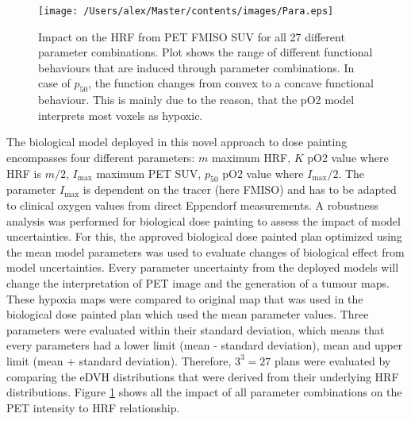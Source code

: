 \begin{figure}[htb]
\centering
\texttt{[image: /Users/alex/Master/contents/images/Para.eps]}
\vspace{1cm}
\caption{Impact on the HRF from PET FMISO SUV for all 27 different parameter combinations. Plot shows the range of different functional behaviours that are induced through parameter combinations. In case of $p_{50}$, the function changes from convex to a concave functional behaviour. This is mainly due to the reason, that the pO2 model interprets most voxels as hypoxic.}
\label{fig:para}
\end{figure}
The biological model deployed in this novel approach to dose painting encompasses four different parameters: $m$ maximum HRF, $K$ pO2 value where HRF is $m/2$, $I_\mathrm{max}$ maximum PET SUV, $p_50$ pO2 value where $I_\mathrm{max}/2$. The parameter $I_\mathrm{max}$ is dependent on the tracer (here FMISO) and has to be adapted to clinical oxygen values from direct Eppendorf measurements. A robustness analysis was performed for biological dose painting to assess the impact of model uncertainties. For this, the approved biological dose painted plan optimized using the mean model parameters was used to evaluate changes of biological effect from model uncertainties. Every parameter uncertainty from the deployed models will change the interpretation of PET image and the generation of a tumour maps. These hypoxia maps were compared to original map that was used in the biological dose painted plan which used the mean parameter values. Three parameters were evaluated within their standard deviation, which means that every parameters had a lower limit (mean - standard deviation), mean and upper limit (mean + standard deviation). Therefore, $3^3=27$ plans were evaluated by comparing the eDVH distributions that were derived from their underlying HRF distributions. Figure \ref{fig:para} shows all the impact of all parameter combinations on the PET intensity to HRF relationship.
